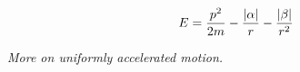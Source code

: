 \documentclass{report}
\begin{document}
\begin{subquests}
\begin{subquests}
		\item
		\begin{gather*}
			E = \frac{p^2}{2m} - \frac{\abs{\alpha}}{r} - \frac{\abs{\beta}}{r^2}
		\end{gather*}
	\end{subquests}

	\item \emph{More on uniformly accelerated motion.}
	
\end{subquests}
\end{document}

